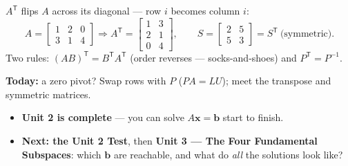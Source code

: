 \documentclass[aspectratio=169, 11pt]{beamer}
\newcommand{\xx}{\mathbf{x}}
\newcommand{\bb}{\mathbf{b}}
\newcommand{\PP}{P}
\newcommand{\tp}{\mathsf{T}}
\begin{document}
\begin{frame}[t, plain]
  $A^{\tp}$ flips $A$ across its diagonal --- row $i$ becomes column $i$:
  \[
    A=\begin{bmatrix} 1&2&0\\3&1&4 \end{bmatrix}\Rightarrow A^{\tp}=\begin{bmatrix} 1&3\\2&1\\0&4 \end{bmatrix},
    \qquad
    S=\begin{bmatrix} 2&5\\5&3 \end{bmatrix}=S^{\tp}\ \text{(symmetric)}.
  \]
  Two rules: $(AB)^{\tp}=B^{\tp}A^{\tp}$ (order reverses --- socks-and-shoes) and $\PP^{\tp}=\PP^{-1}$.
\end{frame}

\begin{frame}[t, plain]
  \textbf{Today:} a zero pivot? Swap rows with $\PP$ ($\PP A=LU$); meet the transpose and symmetric matrices.\\[8pt]
  \begin{itemize}
    \setlength{\itemsep}{4pt}
    \item \textbf{Unit 2 is complete} --- you can solve $A\xx=\bb$ start to finish.
    \item \textbf{Next: the Unit 2 Test}, then \textbf{Unit 3 --- The Four Fundamental Subspaces}: which $\bb$ are reachable, and what do \emph{all} the solutions look like?
  \end{itemize}
\end{frame}
\end{document}
